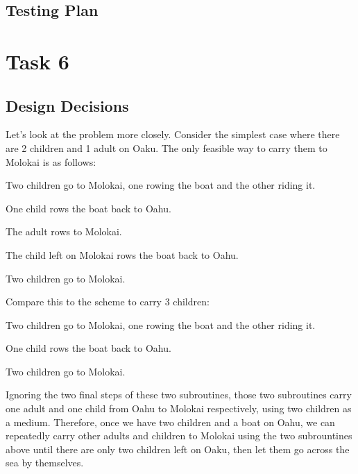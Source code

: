 \documentclass{article}
\begin{document}
\begin{spacing}{1.1}
\subsection{Testing Plan}

\section{Task 6}

\subsection{Design Decisions}
Let's look at the problem more closely. Consider the simplest case where there are 2 children and 1 adult on Oaku. The only feasible way to carry them to Molokai is as follows:
\begin{asparaitem}
  \item Two children go to Molokai, one rowing the boat and the other riding it.\\
  \item One child rows the boat back to Oahu.\\
  \item The adult rows to Molokai.\\
  \item The child left on Molokai rows the boat back to Oahu.\\
  \item Two children go to Molokai.\\
\end{asparaitem}

Compare this to the scheme to carry 3 children:
\begin{asparaitem}
  \item Two children go to Molokai, one rowing the boat and the other riding it.\\
  \item One child rows the boat back to Oahu.\\
  \item Two children go to Molokai.\\
\end{asparaitem}

Ignoring the two final steps of these two subroutines, those two subroutines carry one adult and one child from Oahu to Molokai respectively, using two children as a medium. Therefore, once we have two children and a boat on Oahu, we can repeatedly carry other adults and children to Molokai using the two subrountines above until there are only two children left on Oaku, then let them go across the sea by themselves.\\


\end{spacing}
\end{document}
